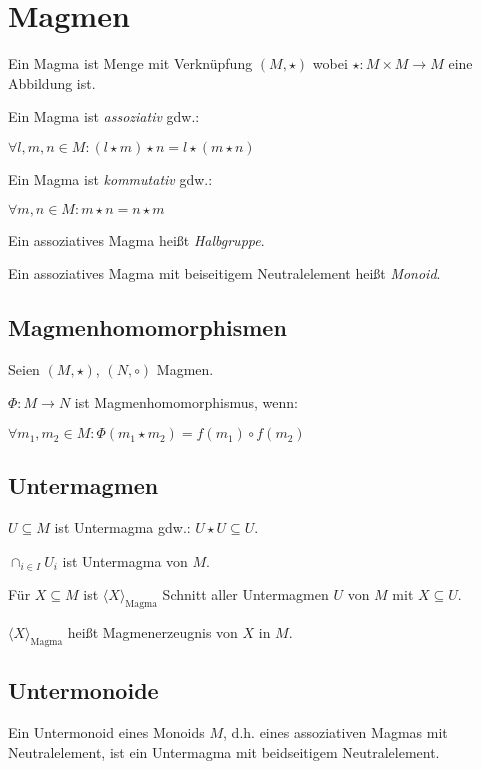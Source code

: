 \section*{Magmen}

Ein Magma ist Menge mit Verknüpfung $(M, \star)$ wobei $\star : M \times M \to M$ eine Abbildung ist.

\vspace*{2mm}

Ein Magma ist \emph{assoziativ} gdw.:

$\forall l, m, n \in M : ( l \star m ) \star n = l \star ( m \star n )$

Ein Magma ist \emph{kommutativ} gdw.:

$\forall m, n \in M : m \star n = n \star m$

Ein assoziatives Magma heißt \emph{Halbgruppe}.

Ein assoziatives Magma mit beiseitigem Neutralelement heißt \emph{Monoid}.

\subsection*{Magmenhomomorphismen}

Seien $(M,\star)$, $(N,\circ)$ Magmen.

$\Phi : M \rightarrow N$ ist Magmenhomomorphismus, wenn:

$\forall m_1, m_2 \in M : \Phi(m_1 \star m_2) = f(m_1) \circ f(m_2)$

\subsection*{Untermagmen}

$U \subseteq M$ ist Untermagma gdw.: $U \star U \subseteq U$.

\vspace*{2mm}

$\cap_{i \in I} U_i$ ist Untermagma von $M$.

Für $X \subseteq M$ ist $\langle X \rangle_{\text{Magma}}$ Schnitt aller Untermagmen $U$ von $M$ mit $X \subseteq U$.

$\langle X \rangle_{\text{Magma}}$ heißt Magmenerzeugnis von $X$ in $M$.

\subsection*{Untermonoide}

Ein Untermonoid eines Monoids $M$, d.h. eines assoziativen Magmas mit Neutralelement, ist ein Untermagma mit beidseitigem Neutralelement.

